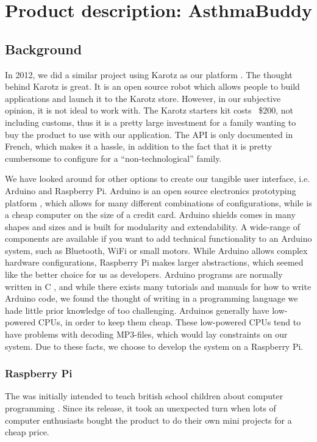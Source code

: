 
\chapter{Product description: AsthmaBuddy}
\label{chp:our-solution}

\section{Background}
In 2012, we did a similar project using Karotz  as our platform \cite{CustomerDriven}. The thought behind Karotz is great. It is an open source robot which allows people to build applications and launch it to the Karotz store. However, in our subjective opinion, it is not ideal to work with. The Karotz starters kit costs ~\$200, not including customs, thus it is a pretty large investment for a family wanting to buy the product to use with our application. The API is only documented in French, which makes it a hassle, in addition to the fact that it is pretty cumbersome to configure for a ``non-technological'' family. 


We have looked around for other options to create our tangible user interface, i.e. Arduino and Raspberry Pi. Arduino is an open source electronics prototyping platform \cite{arduino}, which allows for many different combinations of configurations, while \rpi{} is a cheap computer on the size of a credit card. Arduino shields comes in many shapes and sizes and is built for modularity and extendability. A wide-range of components are available if you want to add technical functionality to an Arduino system, such as Bluetooth, WiFi or small motors. 
While Arduino allows complex hardware configurations, Raspberry Pi makes larger abstractions, which seemed like the better choice for us as developers. Arduino programs are normally written in C \cite{strahl2000language}, and while there exists many tutorials and manuals for how to write Arduino code, we found the thought of writing in a programming language we hade little prior knowledge of too challenging. Arduinos generally have low-powered CPUs, in order to keep them cheap. These low-powered CPUs tend to have problems with decoding MP3-files, which would lay constraints on our system. Due to these facts, we choose to develop the system on a Raspberry Pi.


\subsection{Raspberry Pi}
The \rpi{} was initially intended to teach british school children about computer programming \cite{rasperrypi-about}. Since its release, it took an unexpected turn when lots of computer enthusiasts bought the product to do their own mini projects for a cheap price. 

